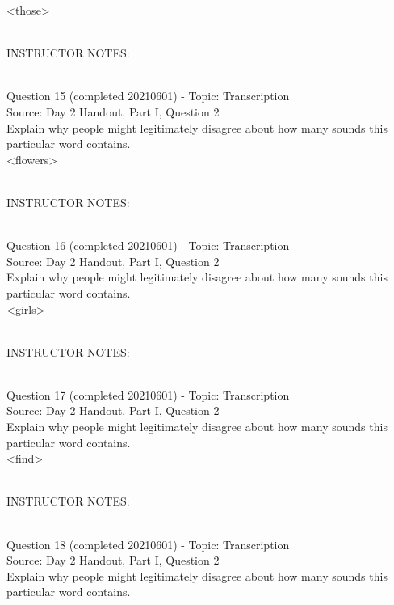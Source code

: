 \documentclass[12pt]{article}
\begin{document}
<those>


~\\
INSTRUCTOR NOTES: 


~\\

{\large Question 15} (completed 20210601) - Topic: Transcription\\
Source: Day 2 Handout, Part I, Question 2\\

Explain why people might legitimately disagree about how many sounds this particular word contains.\\

<flowers>


~\\
INSTRUCTOR NOTES: 


~\\

{\large Question 16} (completed 20210601) - Topic: Transcription\\
Source: Day 2 Handout, Part I, Question 2\\

Explain why people might legitimately disagree about how many sounds this particular word contains.\\

<girls>


~\\
INSTRUCTOR NOTES: 


~\\

{\large Question 17} (completed 20210601) - Topic: Transcription\\
Source: Day 2 Handout, Part I, Question 2\\

Explain why people might legitimately disagree about how many sounds this particular word contains.\\

<find>


~\\
INSTRUCTOR NOTES: 


~\\

{\large Question 18} (completed 20210601) - Topic: Transcription\\
Source: Day 2 Handout, Part I, Question 2\\

Explain why people might legitimately disagree about how many sounds this particular word contains.\\
\end{document}
